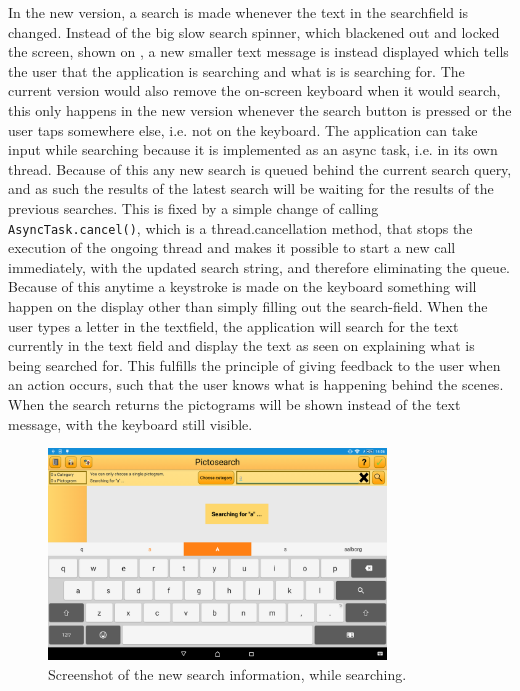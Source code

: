 In the new version, a search is made whenever the text in the searchfield is changed.
Instead of the big slow search spinner, which blackened out and locked the screen, shown on , a new smaller text message is instead displayed which tells the user that the application is searching and what is is searching for. 
The current version would also remove the on-screen keyboard when it would search, this only happens in the new version whenever the search button is pressed or the user taps somewhere else, i.e. not on the keyboard.
The application can take input while searching because it is implemented as an async task, i.e. in its own thread.
Because of this any new search is queued behind the current search query, and as such the results of the latest search will be waiting for the results of the previous searches.
This is fixed by a simple change of calling \texttt{AsyncTask.cancel()}, which is a thread.cancellation method, that stops the execution of the ongoing thread and makes it possible to start a new call immediately, with the updated search string, and therefore eliminating the queue.
Because of this anytime a keystroke is made on the keyboard something will happen on the display other than simply filling out the search-field.
When the user types a letter in the textfield, the application will search for the text currently in the text field and display the text as seen on  explaining what is being searched for. 
This fulfills the principle of giving feedback to the user when an action occurs, such that the user knows what is happening behind the scenes.
When the search returns the pictograms will be shown instead of the text message, with the keyboard still visible.

\begin{figure}[h]
    \centering
    \includegraphics[width=0.8\textwidth]{figures/img/screenshots/new_dialog.png}
    \caption{Screenshot of the new search information, while searching.}\label{fig:screenshot_newsearch}
\end{figure}

